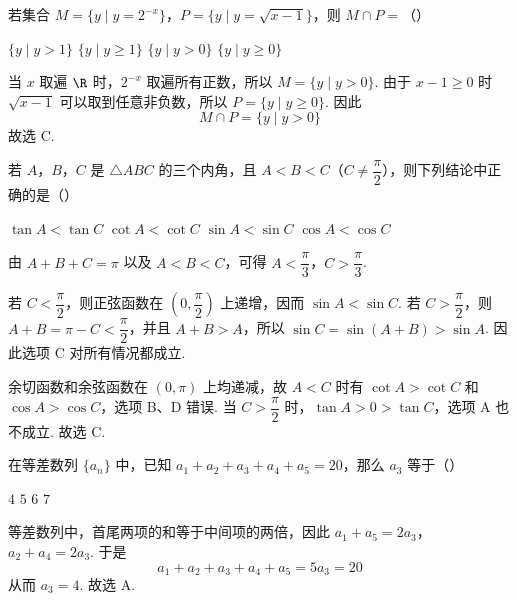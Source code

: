 \begin{problem}
若集合 \(M=\{y\mid y=2^{-x}\}\)，\(P=\{y\mid y=\sqrt{x-1}\}\)，则 \(M\cap P=\)（\quad）

\choices
    {\(\{y\mid y>1\}\)}
    {\(\{y\mid y\geqslant1\}\)}
    {\(\{y\mid y>0\}\)}
    {\(\{y\mid y\geqslant0\}\)}

\begin{solution}
当 \(x\) 取遍 \(\R\) 时，\(2^{-x}\) 取遍所有正数，所以 \(M=\{y\mid y>0\}\). 由于 \(x-1\geqslant0\) 时 \(\sqrt{x-1}\) 可以取到任意非负数，所以 \(P=\{y\mid y\geqslant0\}\). 因此
\[
M\cap P=\{y\mid y>0\}
\]
故选 C.
\end{solution}
\end{problem}

\begin{problem}
若 \(A\)，\(B\)，\(C\) 是 \(\triangle ABC\) 的三个内角，且 \(A<B<C\)（\(C\neq\dfrac{\pi}{2}\)），则下列结论中正确的是（\quad）

\choices
    {\(\tan A<\tan C\)}
    {\(\cot A<\cot C\)}
    {\(\sin A<\sin C\)}
    {\(\cos A<\cos C\)}

\begin{solution}
由 \(A+B+C=\pi\) 以及 \(A<B<C\)，可得 \(A<\dfrac{\pi}{3}\)，\(C>\dfrac{\pi}{3}\).

若 \(C<\dfrac{\pi}{2}\)，则正弦函数在 \(\left(0,\dfrac{\pi}{2}\right)\) 上递增，因而 \(\sin A<\sin C\). 若 \(C>\dfrac{\pi}{2}\)，则 \(A+B=\pi-C<\dfrac{\pi}{2}\)，并且 \(A+B>A\)，所以 \(\sin C=\sin(A+B)>\sin A\). 因此选项 C 对所有情况都成立.

余切函数和余弦函数在 \((0,\pi)\) 上均递减，故 \(A<C\) 时有 \(\cot A>\cot C\) 和 \(\cos A>\cos C\)，选项 B、D 错误. 当 \(C>\dfrac{\pi}{2}\) 时，\(\tan A>0>\tan C\)，选项 A 也不成立. 故选 C.
\end{solution}
\end{problem}

\begin{problem}
在等差数列 \(\{a_n\}\) 中，已知 \(a_1+a_2+a_3+a_4+a_5=20\)，那么 \(a_3\) 等于（\quad）

\choices
    {\(4\)}
    {\(5\)}
    {\(6\)}
    {\(7\)}

\begin{solution}
等差数列中，首尾两项的和等于中间项的两倍，因此
\(a_1+a_5=2a_3\)，\(a_2+a_4=2a_3\).
于是
\[
a_1+a_2+a_3+a_4+a_5=5a_3=20
\]
从而 \(a_3=4\). 故选 A.
\end{solution}
\end{problem}

